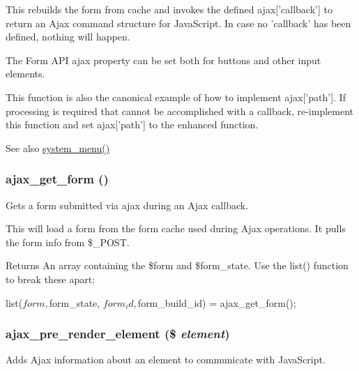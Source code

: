 This rebuilds the form from cache and invokes the defined ajax\mbox{[}'callback'\mbox{]} to return an Ajax command structure for JavaScript. In case no 'callback' has been defined, nothing will happen.

The Form API ajax property can be set both for buttons and other input elements.

This function is also the canonical example of how to implement ajax\mbox{[}'path'\mbox{]}. If processing is required that cannot be accomplished with a callback, re-\/implement this function and set ajax\mbox{[}'path'\mbox{]} to the enhanced function.

\begin{DoxySeeAlso}{See also}
\hyperlink{system_8module_ae25cda0ea4fd63936e8f955dd9cfc269}{system\_\-menu()} 
\end{DoxySeeAlso}
\hypertarget{group__ajax_ga9bc57ec64df41b20fd92b21fe8c1e6b0}{
\subsubsection[{ajax\_\-get\_\-form}]{\setlength{\rightskip}{0pt plus 5cm}ajax\_\-get\_\-form ()}}
\label{group__ajax_ga9bc57ec64df41b20fd92b21fe8c1e6b0}
Gets a form submitted via ajax during an Ajax callback.

This will load a form from the form cache used during Ajax operations. It pulls the form info from \$\_\-POST.

\begin{DoxyReturn}{Returns}
An array containing the \$form and \$form\_\-state. Use the list() function to break these apart: 
\begin{DoxyCode}
     list($form, $form_state, $form_id, $form_build_id) = ajax_get_form();
\end{DoxyCode}
 
\end{DoxyReturn}
\hypertarget{group__ajax_ga028d2f2b6b3875d91ea6cc88b19f237b}{
\subsubsection[{ajax\_\-pre\_\-render\_\-element}]{\setlength{\rightskip}{0pt plus 5cm}ajax\_\-pre\_\-render\_\-element (\$ {\em element})}}
\label{group__ajax_ga028d2f2b6b3875d91ea6cc88b19f237b}
Adds Ajax information about an element to communicate with JavaScript.

